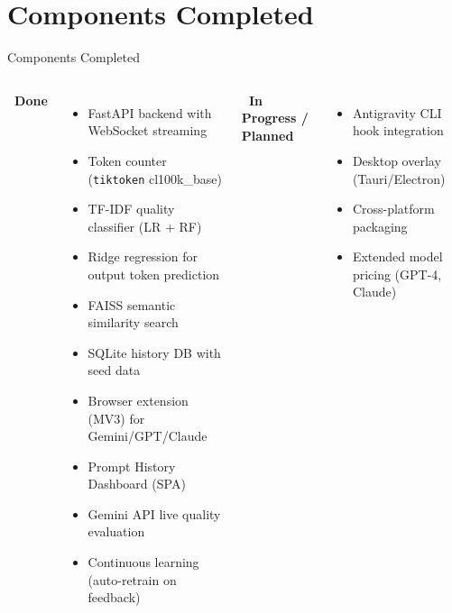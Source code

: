 \documentclass[aspectratio=169]{beamer}
\begin{document}
\section{Components Completed}
\begin{frame}{Components Completed}
  \begin{columns}
    \textbf{\textcolor{good}{\faCheckCircle\ Done}}
    \begin{itemize}
      \item[\textcolor{good}{\checkmark}] FastAPI backend with WebSocket streaming
      \item[\textcolor{good}{\checkmark}] Token counter (\texttt{tiktoken} cl100k\_base)
      \item[\textcolor{good}{\checkmark}] TF-IDF quality classifier (LR + RF)
      \item[\textcolor{good}{\checkmark}] Ridge regression for output token prediction
      \item[\textcolor{good}{\checkmark}] FAISS semantic similarity search
      \item[\textcolor{good}{\checkmark}] SQLite history DB with seed data
      \item[\textcolor{good}{\checkmark}] Browser extension (MV3) for Gemini/GPT/Claude
      \item[\textcolor{good}{\checkmark}] Prompt History Dashboard (SPA)
      \item[\textcolor{good}{\checkmark}] Gemini API live quality evaluation
      \item[\textcolor{good}{\checkmark}] Continuous learning (auto-retrain on feedback)
    \end{itemize}
    \textbf{\textcolor{warn}{\faTools\ In Progress / Planned}}
    \begin{itemize}
      \item[\textcolor{warn}{$\circ$}] Antigravity CLI hook integration
      \item[\textcolor{warn}{$\circ$}] Desktop overlay (Tauri/Electron)
      \item[\textcolor{warn}{$\circ$}] Cross-platform packaging
      \item[\textcolor{warn}{$\circ$}] Extended model pricing (GPT-4, Claude)
    \end{itemize}
  \end{columns}
\end{frame}

\end{document}
